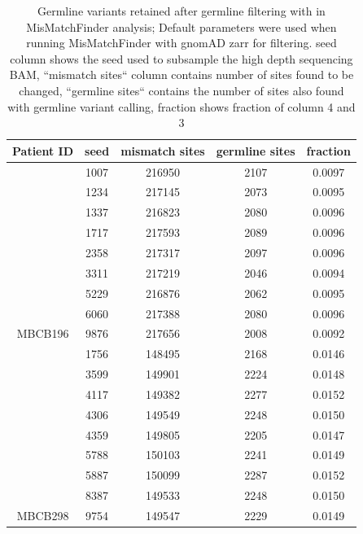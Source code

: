 \begin{table}
\caption[Germline variants retained after germline filtering]{Germline variants retained after germline filtering with in MisMatchFinder analysis; Default parameters were used when running MisMatchFinder with gnomAD zarr for filtering. seed column shows the seed used to subsample the high depth sequencing BAM, ``mismatch sites`` column contains number of sites found to be changed, ``germline sites`` contains the number of sites also found with germline variant calling, fraction shows fraction of column 4 and 3}\label{tab:mmf-germlineArtifacts}
\centering
\begin{tabular}{c|c|c|c|c}
\toprule
\textbf{Patient ID} & \textbf{seed} & \textbf{mismatch sites} & \textbf{germline sites} & \textbf{fraction} \\
\midrule
 & \num{1007} & \num{216950} &  \num{2107} & \num{0.0097}\\ 
 & \num{1234} & \num{217145} &  \num{2073} & \num{0.0095}\\ 
 & \num{1337} & \num{216823} &  \num{2080} & \num{0.0096}\\ 
 & \num{1717} & \num{217593} &  \num{2089} & \num{0.0096}\\ 
 & \num{2358} & \num{217317} &  \num{2097} & \num{0.0096}\\ 
 & \num{3311} & \num{217219} &  \num{2046} & \num{0.0094}\\ 
 & \num{5229} & \num{216876} &  \num{2062} & \num{0.0095}\\ 
 & \num{6060} & \num{217388} &  \num{2080} & \num{0.0096}\\ 
\multirow{-9}{*}{MBCB196} & \num{9876} & \num{217656} &  \num{2008} & \num{0.0092}\\ 
\midrule
 & \num{1756} & \num{148495} &  \num{2168} & \num{0.0146}\\ 
 & \num{3599} & \num{149901} &  \num{2224} & \num{0.0148}\\ 
 & \num{4117} & \num{149382} &  \num{2277} & \num{0.0152}\\ 
 & \num{4306} & \num{149549} &  \num{2248} & \num{0.0150}\\ 
 & \num{4359} & \num{149805} &  \num{2205} & \num{0.0147}\\ 
 & \num{5788} & \num{150103} &  \num{2241} & \num{0.0149}\\ 
 & \num{5887} & \num{150099} &  \num{2287} & \num{0.0152}\\ 
 & \num{8387} & \num{149533} &  \num{2248} & \num{0.0150}\\ 
\multirow{-9}{*}{MBCB298} & \num{9754} & \num{149547} &  \num{2229} & \num{0.0149}\\
\bottomrule
\end{tabular}
\end{table}


